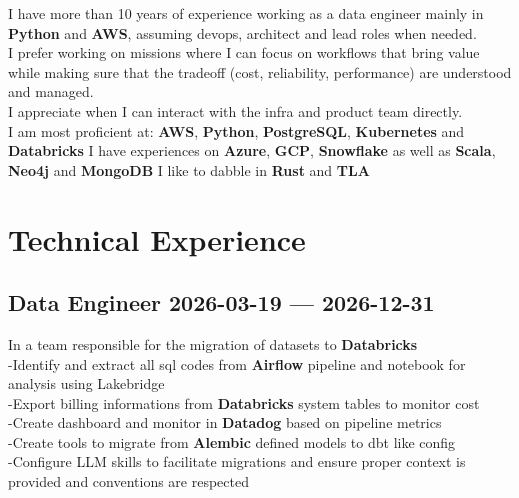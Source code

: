 \documentclass[10pt]{article}
\begin{document}
\pagestyle{others}\thispagestyle{first_page}

I have more than 10 years of experience working as a data engineer mainly in \textbf{Python} and \textbf{AWS}, assuming devops, architect and lead roles when needed.\\
    I prefer working on missions where I can focus on workflows that bring value while making sure that the tradeoff (cost, reliability, performance) are understood and managed.\\
    I appreciate when I can interact with the infra and product team directly.\\
    I am most proficient at: \textbf{AWS}, \textbf{Python}, \textbf{PostgreSQL}, \textbf{Kubernetes} and \textbf{Databricks}
    I have experiences on \textbf{Azure}, \textbf{GCP}, \textbf{Snowflake} as well as \textbf{Scala}, \textbf{Neo4j} and \textbf{MongoDB}
    I like to dabble in \textbf{Rust} and \textbf{TLA}

% 

\section{Technical Experience}

\subsection{{Data Engineer \hspace*{\fill} 2026-03-19 --- 2026-12-31}}
\smallskip
{}
\medskip
In a team responsible for the migration of datasets to \textbf{Databricks}\\
            -Identify and extract all sql codes from \textbf{Airflow} pipeline and notebook for analysis using Lakebridge\\
            -Export billing informations from \textbf{Databricks} system tables to monitor cost\\
            -Create dashboard and monitor in \textbf{Datadog} based on pipeline metrics\\
			-Create tools to migrate from \textbf{Alembic} defined models to dbt like config\\
			-Configure LLM skills to facilitate migrations and ensure proper context is provided and conventions are respected
\medskip
\end{document}
